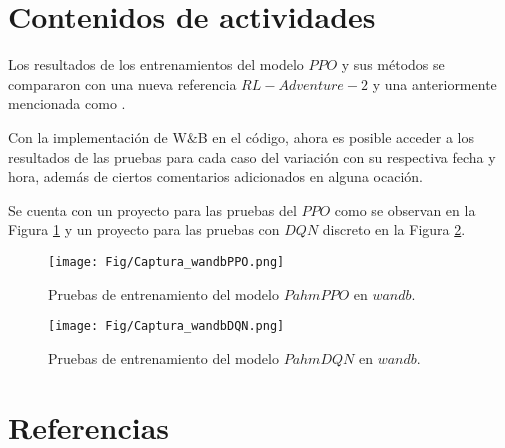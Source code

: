 \documentclass[12pt]{article}
\begin{document}

\newpage
\section*{Contenidos de actividades}

Los resultados de los entrenamientos del modelo $PPO$ y sus métodos se compararon con una nueva referencia \href{https://github.com/henanmemeda/RL-Adventure-2/tree/master}{$RL-Adventure-2$} y una anteriormente mencionada como \cite{PPOimplementation}.

Con la implementación de W$\&$B en el código, ahora es posible acceder a los resultados de las pruebas para cada caso del variación con su respectiva fecha y hora, además de ciertos comentarios adicionados en alguna ocación. 

Se cuenta con un proyecto para las pruebas del $PPO$ como se observan en la Figura \ref{fig:wandbPPO} y un proyecto para las pruebas con $DQN$ discreto en la Figura \ref{fig:wandbDQN}.

\begin{figure}[h!]
	\centering
	\texttt{[image: Fig/Captura\_wandbPPO.png]}
	\caption{Pruebas de entrenamiento del modelo $PahmPPO$ en $wandb$.}
	\label{fig:wandbPPO}
\end{figure}	

\begin{figure}[h!]
	\centering
	\texttt{[image: Fig/Captura\_wandbDQN.png]}
	\caption{Pruebas de entrenamiento del modelo $PahmDQN$ en $wandb$.}
	\label{fig:wandbDQN}
\end{figure}	


\newpage

\section*{Referencias}
\renewcommand\refname{}


\end{document}
